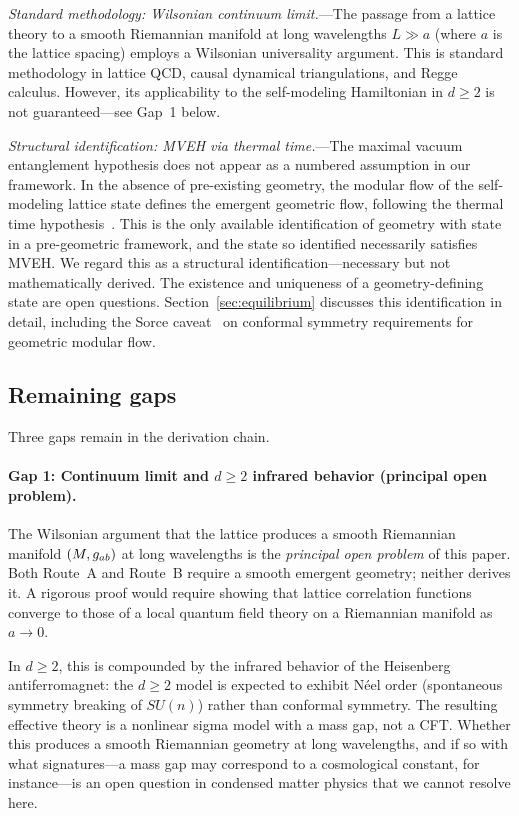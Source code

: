 \emph{Standard methodology: Wilsonian continuum limit.}---The passage
from a lattice theory to a smooth Riemannian manifold at long wavelengths
$L \gg a$ (where $a$ is the lattice spacing) employs a Wilsonian
universality argument.  This is standard methodology in lattice QCD,
causal dynamical triangulations, and Regge calculus.  However, its
applicability to the self-modeling Hamiltonian in $d \geq 2$ is not
guaranteed---see Gap~1 below.

\emph{Structural identification: MVEH via thermal time.}---The maximal
vacuum entanglement hypothesis does not appear as a numbered assumption
in our framework.  In the absence of pre-existing geometry, the modular
flow of the self-modeling lattice state defines the emergent geometric
flow, following the thermal time hypothesis~\cite{ConnesRovelli1994}.
This is the only available identification of geometry with state in a
pre-geometric framework, and the state so identified necessarily
satisfies MVEH.  We regard this as a structural identification---necessary
but not mathematically derived.  The existence and uniqueness of a
geometry-defining state are open questions.
Section~\ref{sec:equilibrium} discusses this identification in detail,
including the Sorce caveat~\cite{Sorce2024} on conformal symmetry
requirements for geometric modular flow.

\subsection{Remaining gaps}
\label{sec:gaps}

Three gaps remain in the derivation chain.

\paragraph{Gap 1: Continuum limit and $d \geq 2$ infrared behavior
(principal open problem).}
The Wilsonian argument that the lattice produces a smooth Riemannian
manifold $(M, g_{ab})$ at long wavelengths is the \emph{principal open
problem} of this paper.  Both Route~A and Route~B require a smooth
emergent geometry; neither derives it.  A rigorous proof would require
showing that lattice correlation functions converge to those of a local
quantum field theory on a Riemannian manifold as $a \to 0$.

In $d \geq 2$, this is compounded by the infrared behavior of the
Heisenberg antiferromagnet: the $d \geq 2$ model is expected to exhibit
N\'eel order (spontaneous symmetry breaking of $SU(n)$) rather than
conformal symmetry.  The resulting effective theory is a nonlinear sigma
model with a mass gap, not a CFT.  Whether this produces a smooth
Riemannian geometry at long wavelengths, and if so with what
signatures---a mass gap may correspond to a cosmological constant, for
instance---is an open question in condensed matter physics that we
cannot resolve here.


